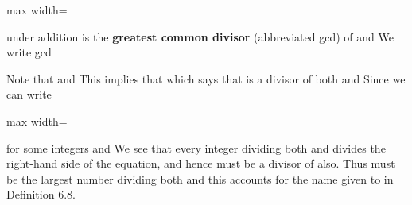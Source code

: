 \documentclass[11pt,oneside]{article}
\begin{document}
\begin{BookBody}
\begin{center}\begin{adjustbox}{max width=\linewidth}\end{adjustbox}\end{center}

\noindent under addition is the\textbf{ greatest common divisor} (abbreviated gcd) of  and  We write  gcd\BookEnd{\blacksquare}

Note that  and  This implies that   which says that  is a divisor of both  and  Since  we can write

\begin{center}\begin{adjustbox}{max width=\linewidth}\end{adjustbox}\end{center}

\noindent for some integers  and  We see that every integer dividing both  and  divides the right-hand side of the equation, and hence must be a divisor of  also. Thus  must 
be the largest number dividing both  and  this accounts for the name given to  in Definition 6.8.

\end{BookBody}

\BookNarrativetrue
\end{document}
